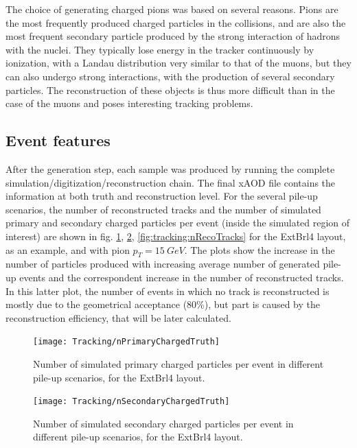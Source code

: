 \documentclass[a4paper,twoside,12pt]{article}
\begin{document}
The choice of generating charged pions was based on several reasons. Pions are the most frequently
produced charged particles in the collisions, and are also the most frequent secondary particle produced by the strong interaction of hadrons with
the nuclei. They typically lose energy in the tracker continuously by ionization, with a Landau distribution very similar to that of the muons, but they can also undergo strong interactions, with the production of several secondary particles. The reconstruction of these objects
is thus more difficult than in the case of the muons and poses interesting tracking problems.

\subsection{Event features}\label{subsec:tracking:eventFeatures}
After the generation step, each sample was produced by running the complete simulation/digitization/reconstruction chain. The final xAOD file contains the information at both
truth and reconstruction level. For the several pile-up scenarios, the number of reconstructed tracks and the number of simulated primary and secondary charged particles per event
(inside the simulated region of interest) are shown in fig. \ref{fig:tracking:nPrimaryChargedTruth}, \ref{fig:tracking:nSecondaryChargedTruth}, \ref{fig:tracking:nRecoTracks} for the ExtBrl4 layout, as an example, and with pion $p_{T} = 15\ GeV$. The plots show the increase in the number of particles produced with increasing average number of generated pile-up events and
the correspondent increase in the number of reconstructed tracks. In this latter plot, the number of events in which no track is reconstructed is mostly due to the geometrical acceptance (80\%), but part is caused by the reconstruction efficiency, that will be later calculated. \\

\begin{figure}
\centering
\texttt{[image: Tracking/nPrimaryChargedTruth]}
\caption{Number of simulated primary charged particles per event in different pile-up scenarios, for the ExtBrl4 layout.}
\label{fig:tracking:nPrimaryChargedTruth}
\end{figure}

\begin{figure}
\centering
\texttt{[image: Tracking/nSecondaryChargedTruth]}
\caption{Number of simulated secondary charged particles per event in different pile-up scenarios, for the ExtBrl4 layout.}
\label{fig:tracking:nSecondaryChargedTruth}
\end{figure}
\end{document}
